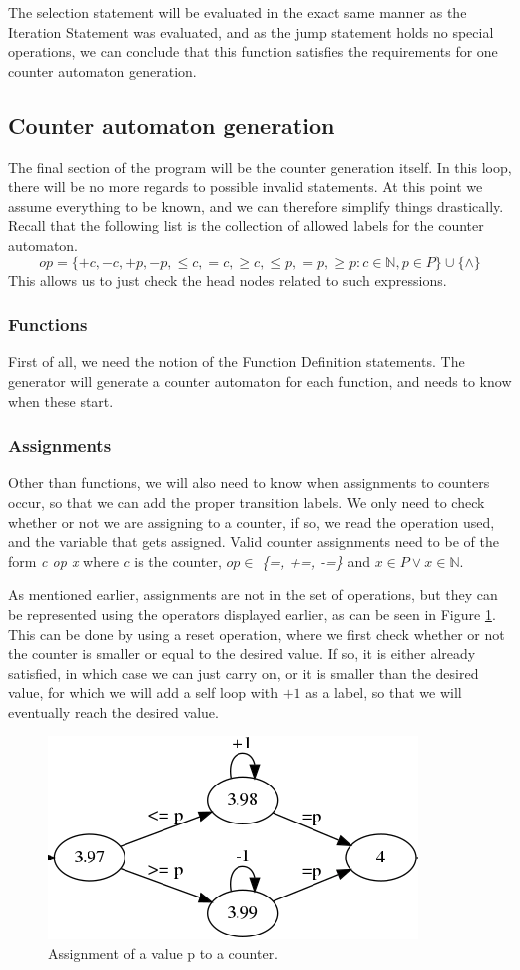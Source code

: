 \documentclass[12pt]{article}
\begin{document}
The selection statement will be evaluated in the exact same manner as the Iteration Statement was evaluated, and as the jump statement holds no special operations, we can conclude that this function satisfies the requirements for one counter automaton generation.

\subsection{Counter automaton generation}
\label{sec:generation}
The final section of the program will be the counter generation itself. In this loop, there will be no more regards to possible invalid statements. At this point we assume everything to be known, and we can therefore simplify things drastically. Recall that the following list is the collection of allowed labels for the counter automaton.
\[
op = \{+c, -c, +p, -p, \leq c, =c, \geq c, \leq p, =p, \geq p: c \in \mathbb{N}, p \in P\} \cup \{\wedge\}
\]
This allows us to just check the head nodes related to such expressions.

\subsubsection{Functions}
First of all, we need the notion of the Function Definition statements. The generator will generate a counter automaton for each function, and needs to know when these start.

\subsubsection{Assignments}
Other than functions, we will also need to know when assignments to counters occur, so that we can add the proper transition labels. We only need to check whether or not we are assigning to a counter, if so, we read the operation used, and the variable that gets assigned. Valid counter assignments need to be of the form \textit{c op x} where $c$ is the counter, $op \in $ \textit{\{=, +=, -=\}} and $x \in P \lor x \in \mathbb{N}$. 

As mentioned earlier, assignments are not in the set of operations, but they can be represented using the operators displayed earlier, as can be seen in Figure \ref{fig:counter_assignment}. This can be done by using a reset operation, where we first check whether or not the counter is smaller or equal to the desired value. If so, it is either already satisfied, in which case we can just carry on, or it is smaller than the desired value, for which we will add a self loop with $+1$ as a label, so that we will eventually reach the desired value. 
\begin{figure}[h]
	\centering
	\includegraphics[width=0.48\linewidth]{counter_assignment}
	\caption{Assignment of a value p to a counter.}
	\label{fig:counter_assignment}
\end{figure}
\end{document}
